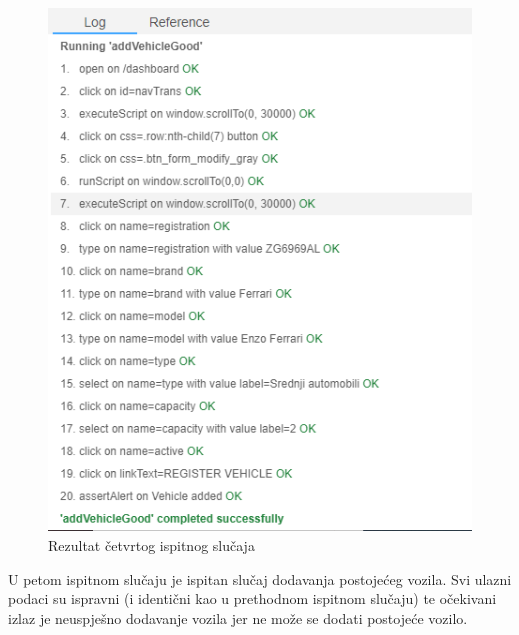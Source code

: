 			\begin{figure}[H]
				\centering
				\includegraphics[width=\textwidth]{"slike/Selenium/transport testovi/addVehicleGood_rezultat.png"}
				\caption{Rezultat četvrtog ispitnog slučaja}
				\label{fig: addVehicleGood_rezultat}
			\end{figure}
			\eject
			U petom ispitnom slučaju je ispitan slučaj dodavanja postojećeg vozila. Svi ulazni podaci su ispravni (i identični kao u prethodnom ispitnom slučaju) te očekivani izlaz je neuspješno dodavanje vozila jer ne može se dodati postojeće vozilo.
